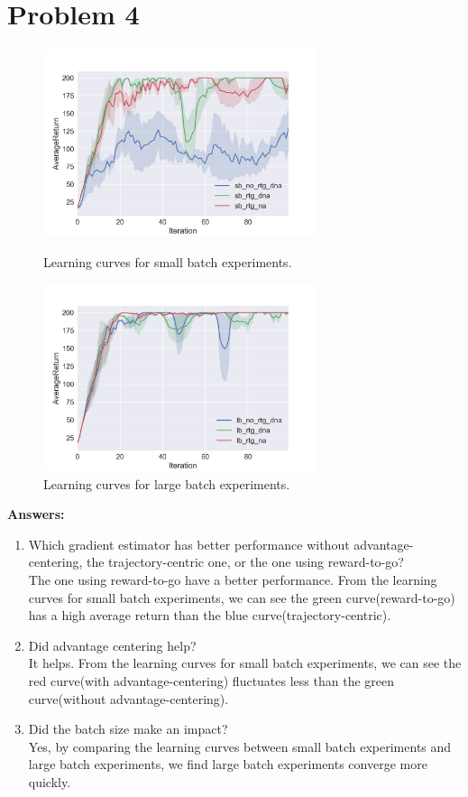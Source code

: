 \documentclass[12pt]{article}
\begin{document}
\section{Problem 4}

\begin{figure}[!h]
\centering
\begin{minipage}[t]{0.48\textwidth}
\centering
\includegraphics[width=8cm]{Figure_1.png}
\caption{Learning curves for small batch experiments.}
\end{minipage}
\begin{minipage}[t]{0.48\textwidth}
\centering
\includegraphics[width=8cm]{Figure_2.png}
\caption{Learning curves for large batch experiments.}
\end{minipage}
\end{figure}

\textbf{Answers:}\\
\begin{enumerate}
\item Which gradient estimator has better performance without advantage-centering, the trajectory-centric one, or the one using reward-to-go?\\
The one using reward-to-go have a better performance. From the learning curves for small batch experiments, we can see the green curve(reward-to-go) has a high average return than the blue curve(trajectory-centric).
\item Did advantage centering help?\\
It helps. From the learning curves for small batch experiments, we can see the red curve(with advantage-centering) fluctuates less than the green curve(without advantage-centering).
\item Did the batch size make an impact?\\
Yes, by comparing the learning curves between small batch experiments and large batch experiments, we find large batch experiments converge more quickly.
\end{enumerate}
\end{document}
